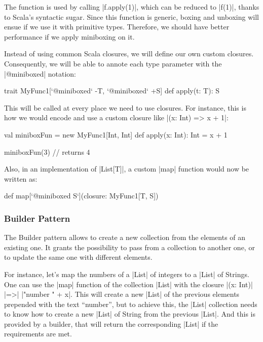 The function is used by calling |f.apply(1)|, which can be reduced to |f(1)|, thanks to Scala's syntactic sugar. Since this function is generic, boxing and unboxing will ensue if we use it with primitive types. Therefore, we should have better performance if we apply miniboxing on it.

Instead of using common Scala closures, we will define our own custom closures. Consequently, we will be able to annote each type parameter with the |@miniboxed| notation:

\begin{lstlisting-nobreak}
 trait MyFunc1[`@miniboxed` -T, `@miniboxed` +S] {
   def apply(t: T): S
 }
\end{lstlisting-nobreak}

This will be called at every place we need to use closures. For instance, this is how we would encode and use a custom closure like |(x: Int) => x + 1|:

\begin{lstlisting-nobreak}
 val miniboxFun = new MyFunc1[Int, Int] {
   def apply(x: Int): Int = x + 1
 }

 miniboxFun(3)   // returns 4
\end{lstlisting-nobreak}

Also, in an implementation of |List[T]|, a custom |map| function would now be written as:

\begin{lstlisting-nobreak}
 def map[`@miniboxed S`](closure: MyFunc1[T, S])
\end{lstlisting-nobreak}

\subsubsection{Builder Pattern}

The Builder pattern allows to create a new collection from the elements of an existing one. It grants the possibility to pass from a collection to another one, or to update the same one with different elements.


For instance, let's map the numbers of a |List| of integers to a |List| of Strings. One can use the |map| function of the collection |List| with the closure |(x: Int)| |=>| |"number " + x|. This will create a new |List| of the previous elements prepended with the text ``number'', but to achieve this, the |List| collection needs to know how to create a new |List| of String from the previous |List|. And this is provided by a builder, that will return the corresponding |List| if the requirements are met.

